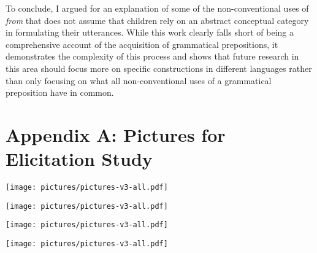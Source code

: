 \documentclass[lucida]{sp} %
\begin{document}
To conclude, I argued for an explanation of some of the non-conventional uses of \textit{from} that does not assume that children rely on an abstract conceptual category in formulating their utterances. While this work clearly falls short of being a comprehensive account of the acquisition of grammatical prepositions, it demonstrates the complexity of this process and shows that future research in this area should focus more on specific constructions in different languages rather than only focusing on what all non-conventional uses of a grammatical preposition have in common.




\section*{Appendix A: Pictures for Elicitation Study}

\texttt{[image: pictures/pictures-v3-all.pdf]}

\texttt{[image: pictures/pictures-v3-all.pdf]}

\texttt{[image: pictures/pictures-v3-all.pdf]}

\texttt{[image: pictures/pictures-v3-all.pdf]}

\pagebreak
\end{document}
